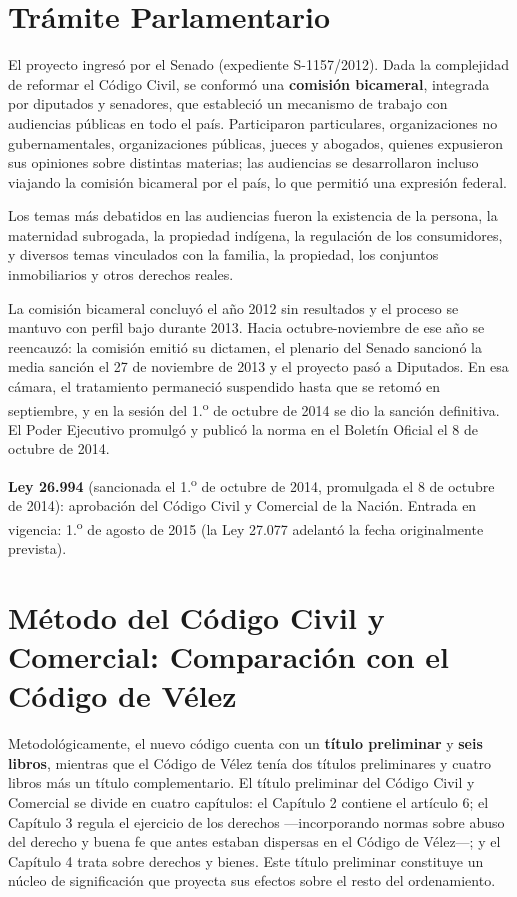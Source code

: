\documentclass[12pt,oneside]{book}
\begin{document}
\section{Trámite Parlamentario}

El proyecto ingresó por el Senado (expediente S-1157/2012). Dada la complejidad de reformar el Código Civil, se conformó una \textbf{comisión bicameral}, integrada por diputados y senadores, que estableció un mecanismo de trabajo con audiencias públicas en todo el país. Participaron particulares, organizaciones no gubernamentales, organizaciones públicas, jueces y abogados, quienes expusieron sus opiniones sobre distintas materias; las audiencias se desarrollaron incluso viajando la comisión bicameral por el país, lo que permitió una expresión federal.

Los temas más debatidos en las audiencias fueron la existencia de la persona, la maternidad subrogada, la propiedad indígena, la regulación de los consumidores, y diversos temas vinculados con la familia, la propiedad, los conjuntos inmobiliarios y otros derechos reales.

La comisión bicameral concluyó el año 2012 sin resultados y el proceso se mantuvo con perfil bajo durante 2013. Hacia octubre-noviembre de ese año se reencauzó: la comisión emitió su dictamen, el plenario del Senado sancionó la media sanción el 27 de noviembre de 2013 y el proyecto pasó a Diputados. En esa cámara, el tratamiento permaneció suspendido hasta que se retomó en septiembre, y en la sesión del 1.\textsuperscript{o} de octubre de 2014 se dio la sanción definitiva. El Poder Ejecutivo promulgó y publicó la norma en el Boletín Oficial el 8 de octubre de 2014.

\begin{important}
\textbf{Ley 26.994} (sancionada el 1.\textsuperscript{o} de octubre de 2014, promulgada el 8 de octubre de 2014): aprobación del Código Civil y Comercial de la Nación. Entrada en vigencia: 1.\textsuperscript{o} de agosto de 2015 (la Ley 27.077 adelantó la fecha originalmente prevista).
\end{important}

\section{Método del Código Civil y Comercial: Comparación con el Código de Vélez}

Metodológicamente, el nuevo código cuenta con un \textbf{título preliminar} y \textbf{seis libros}, mientras que el Código de Vélez tenía dos títulos preliminares y cuatro libros más un título complementario. El título preliminar del Código Civil y Comercial se divide en cuatro capítulos: el Capítulo 2 contiene el artículo 6; el Capítulo 3 regula el ejercicio de los derechos —incorporando normas sobre abuso del derecho y buena fe que antes estaban dispersas en el Código de Vélez—; y el Capítulo 4 trata sobre derechos y bienes. Este título preliminar constituye un núcleo de significación que proyecta sus efectos sobre el resto del ordenamiento.
\end{document}
